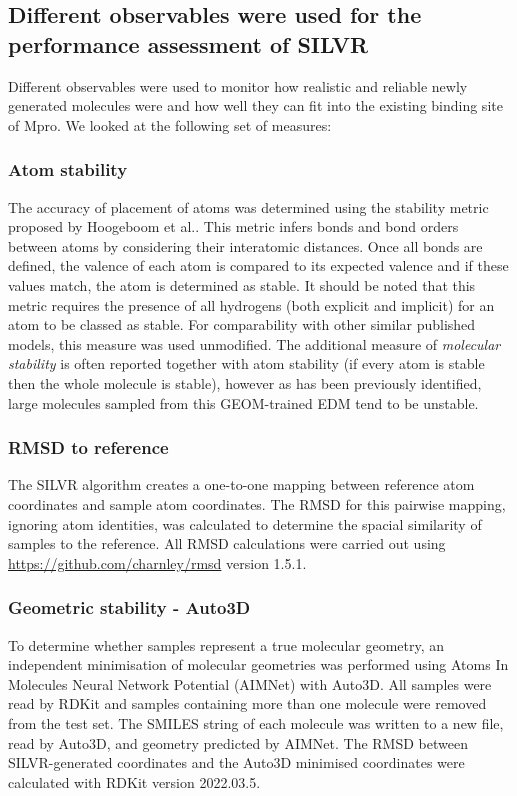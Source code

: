 \documentclass[journal=jacsat,manuscript=article]{achemso}
\begin{document}
\subsection{Different observables were used for the performance assessment of SILVR}

Different observables were used to monitor how realistic and reliable newly generated molecules were and how well they can fit into the existing binding site of Mpro. We looked at the following set of measures:

\subsubsection{Atom stability}
The accuracy of placement of atoms was determined using the stability metric proposed by Hoogeboom et al.. This metric infers bonds and bond orders between atoms by considering their interatomic distances. Once all bonds are defined, the valence of each atom is compared to its expected valence and if these values match, the atom is determined as stable. It should be noted that this metric requires the presence of all hydrogens (both explicit and implicit) for an atom to be classed as stable. For comparability with other similar published models, this measure was used unmodified. The additional measure of \textit{molecular stability} is often reported together with atom stability (if every atom is stable then the whole molecule is stable), however as has been previously identified, large molecules sampled from this GEOM-trained EDM tend to be unstable.

\subsubsection{RMSD to reference}
The SILVR algorithm creates a one-to-one mapping between reference atom coordinates and sample atom coordinates. The RMSD for this pairwise mapping, ignoring atom identities, was calculated to determine the spacial similarity of samples to the reference. All RMSD calculations were carried out using \url{https://github.com/charnley/rmsd} version 1.5.1.

\subsubsection{Geometric stability - Auto3D}
To determine whether samples represent a true molecular geometry, an independent minimisation of molecular geometries was performed using Atoms In Molecules Neural Network Potential (AIMNet) with Auto3D. All samples were read by RDKit and samples containing more than one molecule were removed from the test set. The SMILES string of each molecule was written to a new file, read by Auto3D, and geometry predicted by AIMNet. The RMSD between SILVR-generated coordinates and the Auto3D minimised coordinates were calculated with RDKit version 2022.03.5.
\end{document}
